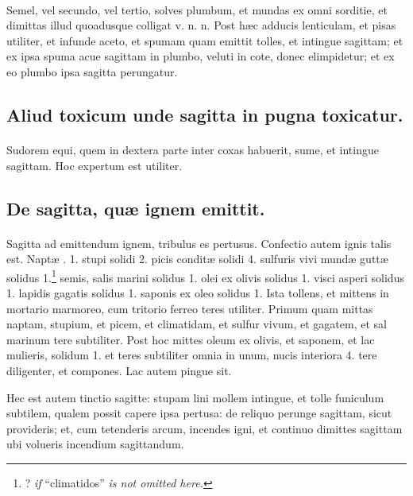 \documentclass[a4paper, 11pt, oneside, polutonikogreek, italian]{article}
\begin{document}
\paragraph{}
Semel, vel secundo, vel tertio, solves plumbum, et mundas ex omni sorditie, et dimittas illud quoadusque colligat v. n. n. Post hæc adducis lenticulam, et pisas utiliter, et infunde aceto, et spumam quam emittit tolles, et intingue sagittam; et ex ipsa spuma acue sagittam in plumbo, veluti in cote, donec elimpidetur; et ex eo plumbo ipsa sagitta perungatur.

\subsection{Aliud toxicum unde sagitta in pugna toxicatur.}
\paragraph{}
Sudorem equi, quem in dextera parte inter coxas habuerit, sume, et intingue sagittam. Hoc expertum est utiliter.

\subsection{De sagitta, quæ ignem emittit.}
\paragraph{}
Sagitta ad emittendum ignem, tribulus es pertusus. Confectio autem ignis talis est. Naptæ \roundz. 1. stupi solidi 2. picis conditæ solidi 4. sulfuris vivi mundæ guttæ solidus 1.\footnote{? \emph{if} ``climatidos'' \emph{is not omitted here.}} semis, salis marini solidus 1. olei ex olivis solidus 1. visci asperi solidus 1. lapidis gagatis solidus 1. saponis ex oleo solidus 1. Ista tollens, et mittens in mortario marmoreo, cum tritorio ferreo teres utiliter. Primum quam mittas naptam, stupium, et picem, et climatidam, et sulfur vivum, et gagatem, et sal marinum tere subtiliter. Post hoc mittes oleum ex olivis, et saponem, et lac mulieris, solidum 1. et teres subtiliter omnia in unum, nucis interiora 4. tere diligenter, et compones. Lac autem pingue sit.

Hec est autem tinctio sagitte: stupam lini mollem intingue, et tolle funiculum subtilem, qualem possit capere ipsa pertusa: de reliquo perunge sagittam, sicut provideris; et, cum tetenderis arcum, incendes igni, et continuo dimittes sagittam ubi volueris incendium sagittandum.
\end{document}
